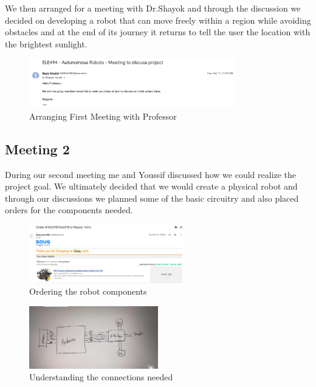 \documentclass[a4paper, 12pt]{article}
\begin{document}
    We then arranged for a meeting with Dr.Shayok and through the discussion we decided on developing a robot that can move freely within a region while avoiding obstacles and at the end of its journey it returns to tell the user the location with the brightest sunlight.

    \begin{figure}[h]
        \centering
        \captionsetup{justification=centering}
        \centering
            \includegraphics[width=0.8\textwidth]{M1}
            \caption{Arranging First Meeting with Professor}
    \end{figure}

    \subsection{Meeting 2}

    During our second meeting me and Youssif discussed how we could realize the project goal. We ultimately decided that we would 
    create a physical robot and through our discussions we planned some of the basic circuitry and also placed orders for the components needed.

    \begin{figure}[h]
        \centering
        \captionsetup{justification=centering}
        \centering
            \includegraphics[width=0.6\textwidth]{Order}
            \caption{Ordering the robot components}
    \end{figure}

    \begin{figure}[h]
        \centering
        \captionsetup{justification=centering}
        \centering
            \includegraphics[width=0.5\textwidth]{Circuit}
            \caption{Understanding the connections needed}
    \end{figure}
\end{document}
